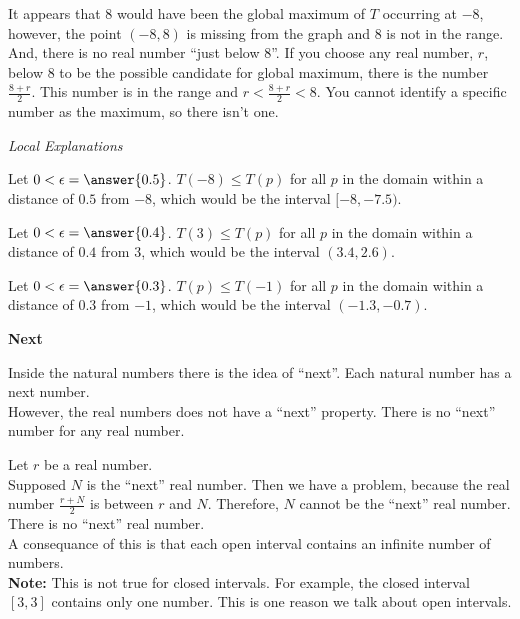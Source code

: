 \documentclass{ximera}
\begin{document}
It appears that $8$ would have been the global maximum of $T$ occurring at $-8$, however, the point $(-8, 8)$ is missing from the graph and $8$ is not in the range.  And, there is no real number ``just below $8$''.  If you choose any real number, $r$, below $8$ to be the possible candidate for global maximum, there is the number $\frac{8+r}{2}$. This number is in the range and $r < \frac{8+r}{2} < 8$.  You cannot identify a specific number as the maximum, so there isn't one.








\begin{explanation} \textit{Local Explanations}


Let $0 < \epsilon = \answer{0.5}$.  $T(-8) \leq T(p)$ for all $p$ in the domain within a distance of $0.5$ from $-8$, which would be the interval $[-8, -7.5)$.

Let $0 < \epsilon = \answer{0.4}$.  $T(3) \leq T(p)$ for all $p$ in the domain within a distance of $0.4$ from $3$, which would be the interval $(3.4, 2.6)$.

Let $0 < \epsilon = \answer{0.3}$.  $T(p) \leq T(-1)$ for all $p$ in the domain within a distance of $0.3$ from $-1$, which would be the interval $(-1.3, -0.7)$.

\end{explanation}





\begin{idea} \textbf{\textcolor{blue!55!black}{Next}}



Inside the natural numbers there is the idea of ``next''.  Each natural number has a next number. \\


However, the real numbers does not have a ``next'' property.  There is no ``next'' number for any real number.


Let $r$ be a real number. \\

Supposed $N$ is the ``next'' real number.  Then we have a problem, because the real number $\frac{r+N}{2}$ is between $r$ and $N$.  Therefore, $N$ cannot be the ``next'' real number.  There is no ``next'' real number. \\


A consequance of this is that each open interval contains an infinite number of numbers. \\



\textbf{Note: } This is not true for closed intervals.  For example, the closed interval $[3, 3]$ contains only one number.  This is one reason we talk about open intervals.



\end{idea}
\end{document}
